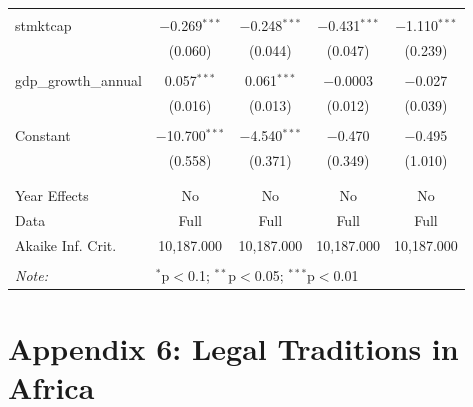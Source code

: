 \documentclass[a4paper,nobind]{templates/ociamthesis}
\begin{document}
\begin{table}[!htbp]
\begin{tabular}{@{\extracolsep{5pt}}lcccc}
  & & & & \\ 
 stmktcap & $-$0.269$^{***}$ & $-$0.248$^{***}$ & $-$0.431$^{***}$ & $-$1.110$^{***}$ \\ 
  & (0.060) & (0.044) & (0.047) & (0.239) \\ 
  & & & & \\ 
 gdp\_growth\_annual & 0.057$^{***}$ & 0.061$^{***}$ & $-$0.0003 & $-$0.027 \\ 
  & (0.016) & (0.013) & (0.012) & (0.039) \\ 
  & & & & \\ 
 Constant & $-$10.700$^{***}$ & $-$4.540$^{***}$ & $-$0.470 & $-$0.495 \\ 
  & (0.558) & (0.371) & (0.349) & (1.010) \\ 
  & & & & \\ 
\hline \\[-1.8ex] 
Year Effects & No & No & No & No \\ 
Data & Full & Full & Full & Full \\ 
Akaike Inf. Crit. & 10,187.000 & 10,187.000 & 10,187.000 & 10,187.000 \\ 
\hline 
\hline \\[-1.8ex] 
\textit{Note:}  & \multicolumn{4}{l}{$^{*}$p$<$0.1; $^{**}$p$<$0.05; $^{***}$p$<$0.01} \\ 
\end{tabular} 
\end{table}

\newpage

\hypertarget{appendix-6-legal-traditions-in-africa}{%
\section{Appendix 6: Legal Traditions in Africa}\label{appendix-6-legal-traditions-in-africa}}
\end{document}
